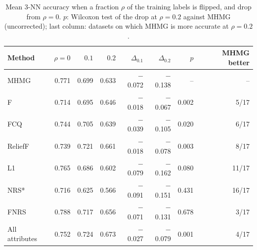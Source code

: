 \begin{table}[!t]
\centering
\caption{Mean 3-NN accuracy when a fraction $\rho$ of the training labels is flipped, and drop from $\rho=0$. $p$: Wilcoxon test of the drop at $\rho=0.2$ against MHMG (uncorrected); last column: datasets on which MHMG is more accurate at $\rho=0.2$.}
\label{tab:noise}
\scriptsize
\setlength{\tabcolsep}{2pt}
\begin{tabular*}{\columnwidth}{@{\extracolsep{\fill}}lrrrrrrr@{}}
\toprule
Method & $\rho=0$ & $0.1$ & $0.2$ & $\Delta_{0.1}$ & $\Delta_{0.2}$ & $p$ & MHMG better \\
\midrule
MHMG & 0.771 & 0.699 & 0.633 & $-$0.072 & $-$0.138 & -- & -- \\
F & 0.714 & 0.695 & 0.646 & $-$0.018 & $-$0.067 & 0.002 & 5/17 \\
FCQ & 0.744 & 0.705 & 0.639 & $-$0.039 & $-$0.105 & 0.020 & 6/17 \\
ReliefF & 0.739 & 0.721 & 0.661 & $-$0.018 & $-$0.078 & 0.003 & 8/17 \\
L1 & 0.765 & 0.686 & 0.602 & $-$0.079 & $-$0.162 & 0.080 & 11/17 \\
NRS* & 0.716 & 0.625 & 0.566 & $-$0.091 & $-$0.151 & 0.431 & 16/17 \\
FNRS & 0.788 & 0.717 & 0.656 & $-$0.071 & $-$0.131 & 0.678 & 3/17 \\
All attributes & 0.752 & 0.724 & 0.673 & $-$0.027 & $-$0.079 & 0.001 & 4/17 \\
\bottomrule
\end{tabular*}
\end{table}
